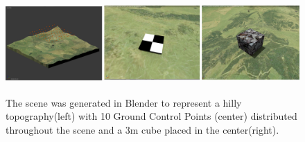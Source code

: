 \begin{figure}[H]
	\centering
	\includegraphics[height = 1.5in]{../fig/scenesummary}

	\caption{The scene was generated in Blender to represent a hilly topography(left) with 10 Ground Control Points (center) distributed throughout the scene and a 3m cube placed in the center(right).}
	\label{fig:scene}
\end{figure}
